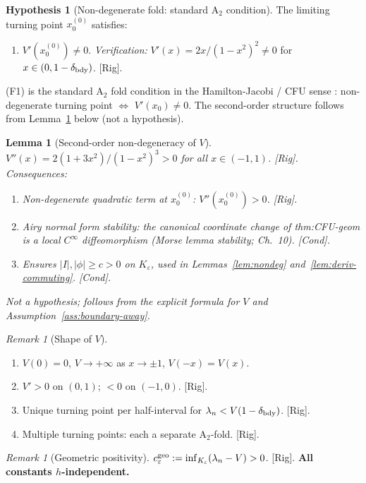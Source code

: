 \documentclass[12pt,a4paper]{amsart}
\newtheorem{lemma}[theorem]{Lemma}
\theoremstyle{definition}
\newtheorem{hypothesis}[theorem]{Hypothesis}
\theoremstyle{remark}
\newtheorem{remark}[theorem]{Remark}
\newcommand{\Rig}{\textup{[Rig]}}
\newcommand{\Cond}{\textup{[Cond]}}
\begin{document}
\begin{hypothesis}[Non-degenerate fold: standard A$_2$ condition]
\label{hyp:a2-fold}
The limiting turning point $x_0^{(0)}$ satisfies:
\begin{enumerate}[{\rm(F1)}]
\item $V'(x_0^{(0)})\ne 0$.
  \emph{Verification:} $V'(x)=2x/(1-x^2)^2\ne 0$
  for $x\in(0,1-\delta_{\rm bdy})$. \Rig.
\end{enumerate}
(F1) is the standard A$_2$ fold condition in the Hamilton-Jacobi / CFU sense
\cite{Zworski2012}: non-degenerate turning point $\Leftrightarrow$ $V'(x_0)\ne 0$.
The second-order structure follows from Lemma~\ref{lem:vpp} below (not a hypothesis).
\end{hypothesis}

\begin{lemma}[Second-order non-degeneracy of $V$]
\label{lem:vpp}
$V''(x)=2(1+3x^2)/(1-x^2)^3>0$ for all $x\in(-1,1)$. \Rig.
Consequences:
\begin{enumerate}[{\rm(i)}]
\item Non-degenerate quadratic term at $x_0^{(0)}$:
  $V''(x_0^{(0)})>0$. \Rig.
\item Airy normal form stability: the canonical coordinate change
  of thm:CFU-geom is a local $C^\infty$ diffeomorphism
  (Morse lemma stability; \cite{Olver1974} Ch.~10). \Cond.
\item Ensures $|I|,|\phi|\ge c>0$ on $K_\varepsilon$,
  used in Lemmas~\ref{lem:nondeg} and~\ref{lem:deriv-commuting}. \Cond.
\end{enumerate}
\emph{Not a hypothesis; follows from the explicit formula for $V$
and Assumption~\ref{ass:boundary-away}.}
\end{lemma}

\begin{remark}[Shape of $V$]
\label{rem:V-shape}
\begin{enumerate}[{\rm(i)}]
\item $V(0)=0$, $V\to+\infty$ as $x\to\pm 1$, $V(-x)=V(x)$.
\item $V'>0$ on $(0,1)$; $<0$ on $(-1,0)$. \Rig.
\item Unique turning point per half-interval
  for $\lambda_n<V(1-\delta_{\rm bdy})$. \Rig.
\item Multiple turning points: each a separate A$_2$-fold. \Rig.
\end{enumerate}
\end{remark}

\begin{remark}[Geometric positivity]
\label{rem:geo-positivity}
$c_\varepsilon^{\rm geo}:=\inf_{K_\varepsilon}(\lambda_n-V)>0$. \Rig.
\textbf{All constants $h$-independent.}
\end{remark}
\end{document}
